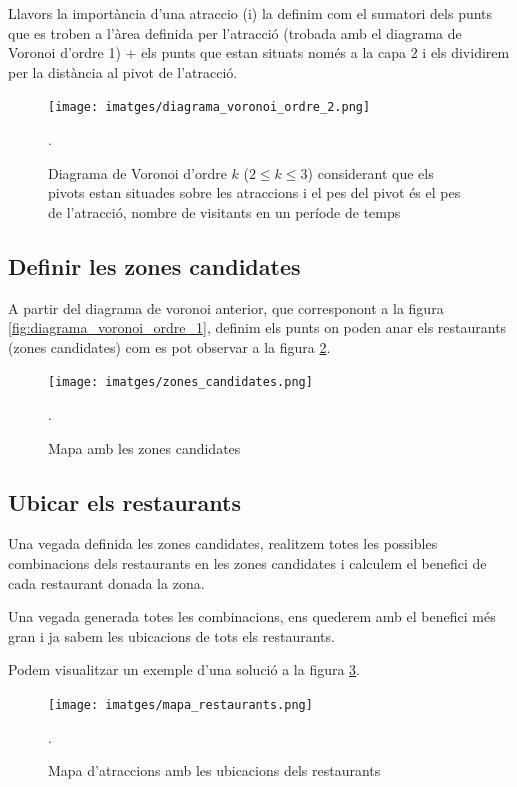 \documentclass[12pt]{article}
\begin{document}
Llavors la importància d'una atraccio (i) la definim com el sumatori dels punts que es troben a l'àrea definida per l’atracció (trobada amb el diagrama de Voronoi d'ordre 1) + els punts que estan situats només a la capa 2 i els dividirem per la distància al pivot de l'atracció.

\begin{figure}[h!]
	\centering
	\texttt{[image: imatges/diagrama\_voronoi\_ordre\_2.png]}\par\vspace{1cm}
	\caption{Diagrama de Voronoi d'ordre $k$ ($2 \le k \le 3$) considerant que els pivots estan situades sobre les atraccions i el pes del pivot és el pes de l'atracció, nombre de visitants en un període de temps}.
	\label{fig:diagrama_voronoi_ordre_2}
\end{figure}

\subsection{Definir les zones candidates}
A partir del diagrama de voronoi anterior, que corresponont a la figura \ref{fig:diagrama_voronoi_ordre_1}, definim els punts on poden anar els restaurants (zones candidates) com es pot observar a la figura \ref{fig:zones_candidates}.

\begin{figure}[h]
	\centering
	\texttt{[image: imatges/zones\_candidates.png]}\par\vspace{1cm}
	\caption{Mapa amb les zones candidates}.
	\label{fig:zones_candidates}
\end{figure}

\subsection{Ubicar els restaurants}

Una vegada definida les zones candidates, realitzem totes les possibles combinacions dels restaurants en les zones candidates i calculem el benefici de cada restaurant donada la zona. 

Una vegada generada totes les combinacions, ens quederem amb el benefici més gran i ja sabem les ubicacions de tots els restaurants.

Podem visualitzar un exemple d'una solució a la figura \ref{fig:mapa_restaurants}.

\begin{figure}[h]
	\centering
	\texttt{[image: imatges/mapa\_restaurants.png]}\par\vspace{1cm}
	\caption{Mapa d'atraccions amb les ubicacions dels restaurants}.
	\label{fig:mapa_restaurants}
\end{figure}
\end{document}
